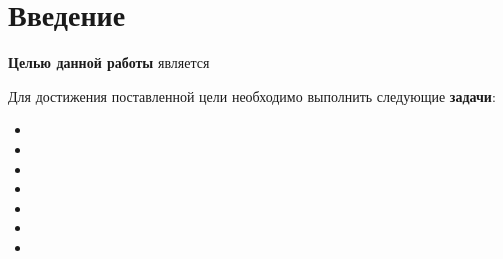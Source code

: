 \chapter*{Введение}



\textbf{Целью данной работы} является

Для достижения поставленной цели необходимо выполнить следующие
\textbf{задачи}:
\begin{itemize}[left=\parindent]
    \item
    \item
    \item
    \item
    \item
    \item
    \item
\end{itemize}
